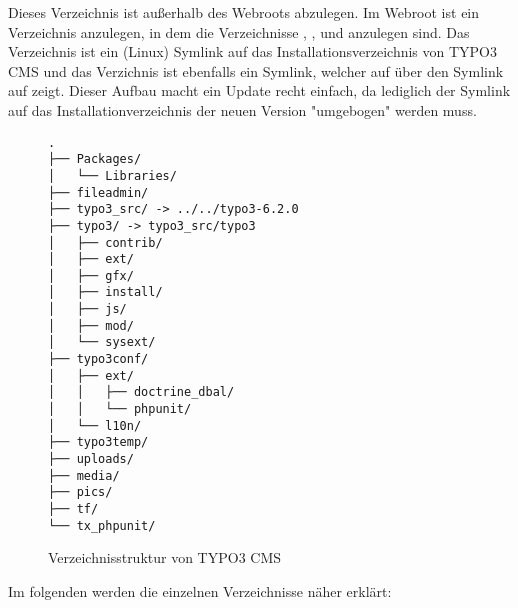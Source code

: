 Dieses Verzeichnis ist außerhalb des Webroots abzulegen. Im Webroot ist ein Verzeichnis  anzulegen, in dem die Verzeichnisse , ,  und  anzulegen sind. Das Verzeichnis  ist ein (Linux) Symlink auf das Installationsverzeichnis von TYPO3 CMS und das Verzichnis  ist ebenfalls ein Symlink, welcher auf über den Symlink  auf  zeigt. Dieser Aufbau macht ein Update recht einfach, da lediglich der Symlink  auf das Installationverzeichnis der neuen Version "umgebogen" werden muss.

\begin{figure}
\begin{Verbatim}[samepage=true]
.
├── Packages/
│   └── Libraries/
├── fileadmin/
├── typo3_src/ -> ../../typo3-6.2.0
├── typo3/ -> typo3_src/typo3
│   ├── contrib/
│   ├── ext/
│   ├── gfx/
│   ├── install/
│   ├── js/
│   ├── mod/
│   └── sysext/
├── typo3conf/
│   ├── ext/
│   │   ├── doctrine_dbal/
│   │   └── phpunit/
│   └── l10n/
├── typo3temp/
├── uploads/
├── media/
├── pics/
├── tf/
└── tx_phpunit/
\end{Verbatim}
\caption{Verzeichnisstruktur von TYPO3 CMS}
\label{pic:typo3FolderStructure}
\end{figure}
Im folgenden werden die einzelnen Verzeichnisse näher erklärt:

